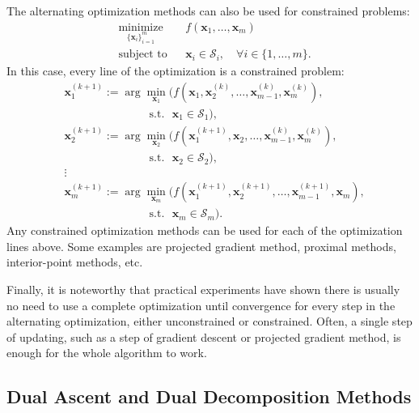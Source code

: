 \documentclass[lang=cn,10pt]{gorgeousnbook}
\numberwithin{equation}{section}%
\numberwithin{figure}{section}%
\begin{document}
The alternating optimization methods can also be used for constrained problems:
\begin{equation}
\begin{aligned}
& \underset{\{\boldsymbol{x}_i\}_{i=1}^m}{\text{minimize}}
& & f(\boldsymbol{x}_1, \dots, \boldsymbol{x}_m) \\
& \text{subject to}
& & \boldsymbol{x}_i \in \mathcal{S}_i,\quad \forall i \in \{1, \dots, m\}.
\end{aligned}
\end{equation}
In this case, every line of the optimization is a constrained problem:
\begin{align*}
& \boldsymbol{x}_1^{(k+1)} := \arg \min_{\boldsymbol{x}_1} \Big( f(\boldsymbol{x}_1, \boldsymbol{x}_2^{(k)}, \dots, \boldsymbol{x}_{m-1}^{(k)}, \boldsymbol{x}_m^{(k)}), \\
&~~~~~~~~~~~~~~~~~~~~~~~~~~~~~~~~~~ \text{s.t. }\,\, \boldsymbol{x}_1 \in \mathcal{S}_1 \Big), \\
& \boldsymbol{x}_2^{(k+1)} := \arg \min_{\boldsymbol{x}_2} \Big( f(\boldsymbol{x}_1^{(k+1)}, \boldsymbol{x}_2, \dots, \boldsymbol{x}_{m-1}^{(k)}, \boldsymbol{x}_m^{(k)}), \\
&~~~~~~~~~~~~~~~~~~~~~~~~~~~~~~~~~~ \text{s.t. }\,\, \boldsymbol{x}_2 \in \mathcal{S}_2 \Big), \\
& \vdots \\
& \boldsymbol{x}_m^{(k+1)} := \arg \min_{\boldsymbol{x}_m} \Big( f(\boldsymbol{x}_1^{(k+1)}, \boldsymbol{x}_2^{(k+1)}, \dots, \boldsymbol{x}_{m-1}^{(k+1)}, \boldsymbol{x}_m), \\
&~~~~~~~~~~~~~~~~~~~~~~~~~~~~~~~~~~ \text{s.t. }\,\, \boldsymbol{x}_m \in \mathcal{S}_m \Big).
\end{align*}
Any constrained optimization methods can be used for each of the optimization lines above. 
Some examples are projected gradient method, proximal methods, interior-point methods, etc. 

Finally, it is noteworthy that practical experiments have shown there is usually no need to use a complete optimization until convergence for every step in the alternating optimization, either unconstrained or constrained. Often, a single step of updating, such as a step of gradient descent or projected gradient method, is enough for the whole algorithm to work. 

\subsection{Dual Ascent and Dual Decomposition Methods}
\end{document}
